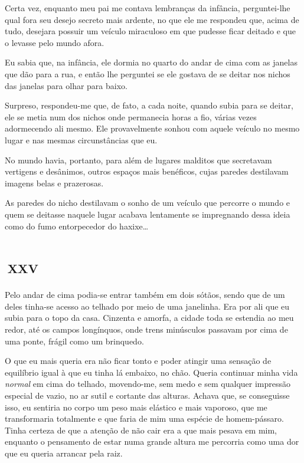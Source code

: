 Certa vez, enquanto meu pai me contava lembranças da infância, perguntei-lhe qual fora seu desejo secreto mais ardente, no que ele me respondeu que, acima de tudo, desejara possuir um veículo miraculoso em que pudesse ficar deitado e que o levasse pelo mundo afora.

Eu sabia que, na infância, ele dormia no quarto do andar de cima com as janelas que dão para a rua, e então lhe perguntei se ele gostava de se deitar nos nichos das janelas para olhar para baixo.

Surpreso, respondeu-me que, de fato, a cada noite, quando subia para se deitar, ele se metia num dos nichos onde permanecia horas a fio, várias vezes adormecendo ali mesmo. Ele provavelmente sonhou com aquele veículo no mesmo lugar e nas mesmas circunstâncias que eu.

No mundo havia, portanto, para além de lugares malditos que secretavam vertigens e desânimos, outros espaços mais benéficos, cujas paredes destilavam imagens belas e prazerosas.

As paredes do nicho destilavam o sonho de um veículo que percorre o mundo e quem se deitasse naquele lugar acabava lentamente se impregnando dessa ideia como do fumo entorpecedor do haxixe\ldots{}


\chapter*{\small{}\,\Large\centering\textsc{xxv}\,\small{}}

Pelo andar de cima podia-se entrar também em dois sótãos, sendo que de um deles tinha-se acesso ao telhado por meio de uma janelinha. Era por ali que eu subia para o topo da casa. Cinzenta e amorfa, a cidade toda se estendia ao meu redor, até os campos longínquos, onde trens minúsculos passavam por cima de uma ponte, frágil como um brinquedo.

O que eu mais queria era não ficar tonto e poder atingir uma sensação de equilíbrio igual à que eu tinha lá embaixo, no chão. Queria continuar minha vida \textit{normal} em cima do telhado, movendo-me, sem medo e sem qualquer impressão especial de vazio, no ar sutil e cortante das alturas. Achava que, se conseguisse isso, eu sentiria no corpo um peso mais elástico e mais vaporoso, que me transformaria totalmente e que faria de mim uma espécie de homem-pássaro. Tinha certeza de que a atenção de não cair era a que mais pesava em mim, enquanto o pensamento de estar numa grande altura me percorria como uma dor que eu queria arrancar pela raiz.


